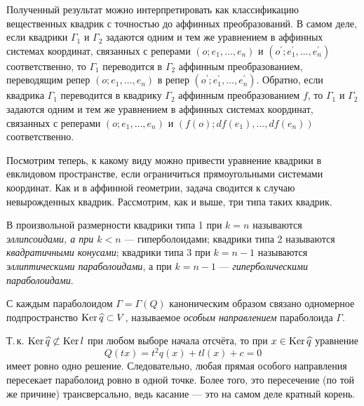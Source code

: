 Полученный результат можно интерпретировать как классификацию вещественных квадрик с точностью до аффинных преобразований. В самом деле, если квадрики $\Gamma_1$ и $\Gamma_2$ задаются одним и тем же уравнением в аффинных системах координат, связанных с реперами $(o; e_1, \ldots, e_n)$ и $(o^\prime; e_1^\prime, \ldots, e_n^\prime)$ соответственно, то $\Gamma_1$ переводится в $\Gamma_2$ аффинным преобразованием, переводящим репер $(o; e_1, \ldots, e_n)$ в репер $(o^\prime; e_1^\prime, \ldots, e_n^\prime)$. Обратно, если квадрика $\Gamma_1$ переводится в квадрику $\Gamma_2$ аффинным преобразованием $f$, то $\Gamma_1$ и $\Gamma_2$ задаются одним и тем же уравнением в аффинных системах координат, связанных с реперами $(o; e_1, \ldots, e_n)$ и $(f(o); df(e_1), \ldots, df(e_n))$ соответственно.

Посмотрим теперь, к какому виду можно привести уравнение квадрики в евклидовом пространстве, если ограничиться прямоугольными системами координат. Как и в аффинной геометрии, задача сводится к случаю невырожденных квадрик. Рассмотрим, как и выше, три типа таких квадрик.

\begin{definition}
    В произвольной размерности квадрики типа 1 при $k = n$ называются \textit{эллипсоидами, а при $k < n$} --- гиперболоидами; квадрики типа 2 называются \textit{квадратичными конусами}; квадрики типа 3 при $k = n - 1$ называются \textit{эллиптическими параболоидами}, а при $k = n - 1$ --- \textit{гиперболическими параболоидами}.
\end{definition}

\begin{definition}
    С каждым параболоидом $\Gamma = \Gamma(Q)$ каноническим образом связано одномерное подпространство $\operatorname{Ker}\widehat{q} \subset V$, называемое \textit{особым направлением} параболоида $\Gamma$.
\end{definition}

Т.\,к. $\operatorname{Ker} \widehat{q} \not\subset \operatorname{Ker} l$ при любом выборе начала отсчёта, то при $x \in \operatorname{Ker}\widehat{q}$ уравнение
\[
    Q(tx) = t^2q(x) + tl(x) + c = 0
\]
имеет ровно одно решение. Следовательно, любая прямая особого направления пересекает параболоид ровно в одной точке. Более того, это пересечение (по той же причине) трансверсально, ведь касание --- это на самом деле кратный корень.

